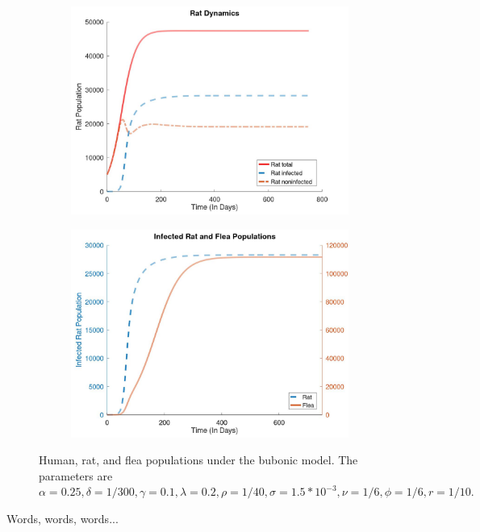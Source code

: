 \documentclass [letterpaper, 12pt] {article}
\begin{document}
\begin{figure}[h!]
\begin{subfigure}{0.48\textwidth}
	\includegraphics[width=\linewidth]{Figures/bubonicrat.jpg}
	\end{subfigure}\hspace{\fill}
	\begin{subfigure}{0.48\textwidth}
	\includegraphics[width=\linewidth]{Figures/Bubonicrf.jpg}
	\end{subfigure}
	\caption{Human, rat, and flea populations under the bubonic model. The parameters are $\alpha=0.25, \delta=1/300, \gamma=0.1, \lambda=0.2, \rho=1/40, \sigma=1.5*10^{-3}, \nu=1/6, \phi=1/6, r=1/10.$}
\end{figure}

Words, words, words...
\end{document}
